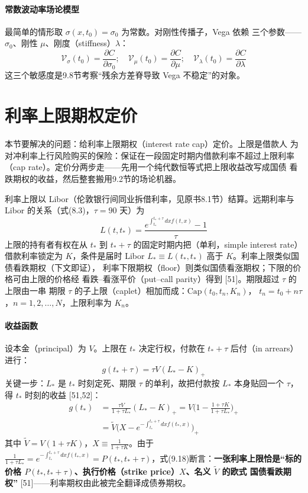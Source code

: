 \paragraph{常数波动率场论模型}
最简单的情形取 $\sigma(x,t_0)=\sigma_0$ 为常数。对刚性传播子，Vega 依赖
三个参数——$\sigma_0$、刚性 $\mu$、刚度（stiffness）$\lambda$：
\begin{equation*}
\mathcal{V}_{\sigma}(t_0)=\frac{\partial C}{\partial\sigma_0};\quad
\mathcal{V}_{\mu}(t_0)=\frac{\partial C}{\partial\mu};\quad
\mathcal{V}_{\lambda}(t_0)=\frac{\partial C}{\partial\lambda}
\end{equation*}
这三个敏感度是9.8节考察“残余方差脊导致 Vega 不稳定”的对象。

\section{利率上限期权定价}

本节要解决的问题：给利率上限期权（interest rate cap）定价。上限是借款人
为对冲利率上行风险购买的保险：保证在一段固定时期内借款利率不超过上限利率
（cap rate）。定价分两步走——先用一个纯代数恒等式把上限收益改写成国债
看跌期权的收益，然后整套搬用9.2节的场论机器。

利率上限以 Libor（伦敦银行间同业拆借利率，见原书8.1节）结算。远期利率与
Libor 的关系（式(8.3)，$\tau=90$ 天）为
\begin{equation*}
L(t,t_*)=\frac{e^{\int_{t_*}^{t_*+\tau}dxf(t,x)}-1}{\tau}\tag{9.16}
\end{equation*}
上限的持有者有权在从 $t_*$ 到 $t_*+\tau$ 的固定时期内把（单利，simple
interest rate）借款利率锁定为 $K$，条件是届时 Libor
$L_{*}\equiv L(t_*,t_*)$ 高于 $K$。利率上限类似国债看跌期权（下文即证），
利率下限期权（floor）则类似国债看涨期权；下限的价格可由上限的价格经
看跌--看涨平价（put--call parity）得到 [51]。期限超过 $\tau$ 的上限由一串
期限 $\tau$ 的子上限（caplet）相加而成：$\mathrm{Cap}(t_0,t_n,K_n)$，
$t_n=t_0+n\tau$，$n=1,2,\dots,N$，上限利率为 $K_n$。

\paragraph{收益函数}
设本金（principal）为 $V$。上限在 $t_*$ 决定行权，付款在 $t_*+\tau$
后付（in arrears）进行：
\begin{equation*}
g(t_*+\tau)=\tau V(L_{*}-K)_{+}\tag{9.17}
\end{equation*}
关键一步：$L_{*}$ 是 $t_*$ 时刻定死、期限 $\tau$ 的单利，故把付款按 $L_{*}$
本身贴回一个 $\tau$，得 $t_*$ 时刻的收益 [51,52]：
\begin{align*}
g(t_*)&=\frac{\tau V}{1+\tau L_{*}}(L_{*}-K)_{+}
=V\biggl(1-\frac{1+\tau K}{1+\tau L_{*}}\biggr)_{+}\\
&=\tilde{V}\biggl(X-e^{-\int_{t_*}^{t_*+\tau}dxf(t_*,x)}\biggr)_{+}
\tag{9.18}\end{align*}
其中 $\tilde{V}=V(1+\tau K)$，$X\equiv\frac{1}{1+\tau K}$。由于
$\frac{1}{1+\tau L_{*}}=e^{-\int_{t_*}^{t_*+\tau}dxf(t_*,x)}
=P(t_*,t_*+\tau)$，式(9.18)断言：\textbf{一张利率上限恰是“标的价格
$P(t_*,t_*+\tau)$、执行价格（strike price）$X$、名义 $\tilde{V}$ 的欧式
国债看跌期权”} [51]——利率期权由此被完全翻译成债券期权。


